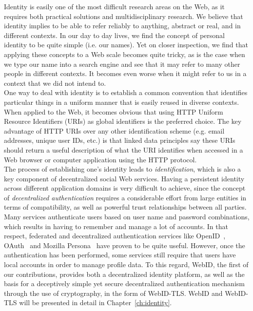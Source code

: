 Identity is easily one of the most difficult research areas on the Web, as it requires both practical solutions and multidisciplinary research. We believe that identity implies to be able to refer reliably to anything, abstract or real, and in different contexts. In our day to day lives, we find the concept of personal identity to be quite simple (i.e. our names). Yet on closer inspection, we find that applying these concepts to a Web scale becomes quite tricky, as is the case when we type our name into a search engine and see that it may refer to many other people in different contexts. It becomes even worse when it might refer to us in a context that we did not intend to.\\

One way to deal with identity is to establish a common convention that identifies particular things in a uniform manner that is 
easily reused in diverse contexts. When applied to the Web, it becomes obvious that using HTTP Uniform Resource Identifiers (URIs) as global identifiers is the preferred choice. The key advantage of HTTP URIs over any other identification scheme (e.g. email addresses, unique user IDs, etc.) is that linked data principles say these URIs should return a useful description of what the URI identifies when accessed in a Web browser or computer application using the HTTP protocol.\\

The process of establishing one's identity leads to \textit{identification}, which is also a key component of decentralized social Web services. Having a persistent identity across different application domains is very difficult to achieve, since the concept of \textit{decentralized authentication} requires a considerable effort from large entities in terms of compatibility, as well as powerful trust relationships between all parties. Many services authenticate users based on user name and password combinations, which results in having to remember and manage a lot of accounts. In that respect, federated and decentralized authentication services like OpenID~\cite{recordon2006openid}, OAuth~\cite{hardt-d-2012-a} and Mozilla Persona~\cite{browserid} have proven to be quite useful. However, once the authentication has been performed, some services still require that users have local accounts in order to manage profile data. To this regard, WebID, the first of our contributions, provides both a decentralized identity platform, as well as the basis for a deceptively simple yet secure decentralized authentication mechanism through the use of cryptography, in the form of WebID-TLS. WebID and WebID-TLS will be presented in detail in Chapter~\ref{ch:identity}.

